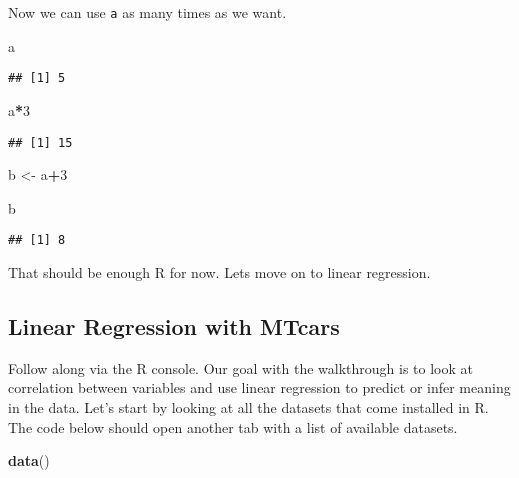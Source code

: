 \documentclass[]{book}
\newenvironment{Shaded}{\begin{snugshade}}{\end{snugshade}}
\newcommand{\KeywordTok}[1]{\textcolor[rgb]{0.13,0.29,0.53}{\textbf{#1}}}
\newcommand{\DecValTok}[1]{\textcolor[rgb]{0.00,0.00,0.81}{#1}}
\newcommand{\StringTok}[1]{\textcolor[rgb]{0.31,0.60,0.02}{#1}}
\newcommand{\OperatorTok}[1]{\textcolor[rgb]{0.81,0.36,0.00}{\textbf{#1}}}
\newcommand{\NormalTok}[1]{#1}
\begin{document}
Now we can use \texttt{a} as many times as we want.

\begin{Shaded}
\begin{Highlighting}[]
\NormalTok{a}
\end{Highlighting}
\end{Shaded}

\begin{verbatim}
## [1] 5
\end{verbatim}

\begin{Shaded}
\begin{Highlighting}[]
\NormalTok{a}\OperatorTok{*}\DecValTok{3}
\end{Highlighting}
\end{Shaded}

\begin{verbatim}
## [1] 15
\end{verbatim}

\begin{Shaded}
\begin{Highlighting}[]
\NormalTok{b <-}\StringTok{ }\NormalTok{a}\OperatorTok{+}\DecValTok{3}
\end{Highlighting}
\end{Shaded}

\begin{Shaded}
\begin{Highlighting}[]
\NormalTok{b}
\end{Highlighting}
\end{Shaded}

\begin{verbatim}
## [1] 8
\end{verbatim}

That should be enough R for now. Lets move on to linear regression.

\subsection{Linear Regression with
MTcars}\label{linear-regression-with-mtcars}

Follow along via the R console. Our goal with the walkthrough is to look
at correlation between variables and use linear regression to predict or
infer meaning in the data. Let's start by looking at all the datasets
that come installed in R. The code below should open another tab with a
list of available datasets.

\begin{Shaded}
\begin{Highlighting}[]
\KeywordTok{data}\NormalTok{()}
\end{Highlighting}
\end{Shaded}
\end{document}
